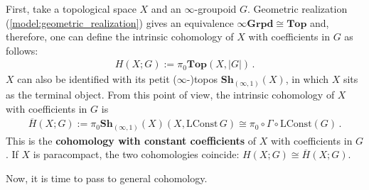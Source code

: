         First, take a topological space $X$ and an $\infty$-groupoid $G$. Geometric realization (\cref{model:geometric_realization}) gives an equivalence $\infty\mathbf{Grpd}\cong\mathbf{Top}$ and, therefore, one can define the intrinsic cohomology of $X$ with coefficients in $G$ as follows:
        \begin{gather}
            H(X;G) := \pi_0\mathbf{Top}(X,|G|)\,.
        \end{gather}
        $X$ can also be identified with its petit ($\infty$-)topos $\mathbf{Sh}_{(\infty,1)}(X)$, in which $X$ sits as the terminal object. From this point of view, the intrinsic cohomology of $X$ with coefficients in $G$ is
        \begin{gather}
            \overline{H}(X;G) := \pi_0\mathbf{Sh}_{(\infty,1)}(X)(X,\mathrm{LConst}\,G)\cong\pi_0\circ\Gamma\circ\mathrm{LConst}(G)\,.
        \end{gather}
        This is the \textbf{cohomology with constant coefficients} of $X$ with coefficients in $G$. If $X$ is paracompact, the two cohomologies coincide: $H(X;G)\cong\overline{H}(X;G)$.
    
        Now, it is time to pass to general cohomology.
    
